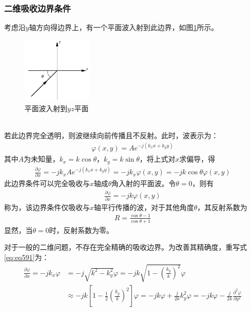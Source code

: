 \documentclass{article}
\numberwithin{equation}{section}
\begin{document}
\subsubsection{二维吸收边界条件}
考虑沿$y$轴方向得边界上，有一个平面波入射到此边界，如图\ref{fig:fig51}所示。
\begin{figure}[ht]
    \centering
    \includegraphics[width=0.3\textwidth]{平面波入射到yz平面.PNG}
    \caption{平面波入射到$yz$平面}
    \label{fig:fig51}
\end{figure}
\\
若此边界完全透明，则波继续向前传播且不反射。此时，波表示为：
\begin{align}
    \label{eq:eq590}
    \varphi(x,y)=Ae^{-j(k_xx+k_yy)}
\end{align}
其中$A$为未知量，$k_x=k\cos\theta$，$k_y=k\sin\theta$，将上式对$x$求偏导，得
\begin{align}
    \label{eq:eq591}
    \frac{\partial \varphi}{\partial x}=-jk_xAe^{-j(k_xx+k_yy)}=-jk_x\varphi(x,y)=-jk\cos\theta\varphi(x,y)
\end{align}
此边界条件可以完全吸收与$x$轴成$\theta$角入射的平面波。令$\theta=0$，则有
\begin{align}
    \label{eq:eq592}
    \frac{\partial \varphi}{\partial x}=-jk\varphi(x,y)
\end{align}
称为\textbf{\color{blue}{一阶吸收边界条件}}，该边界条件仅吸收与$x$轴平行传播的波，对于其他角度$\theta$，其反射系数为
\begin{align}
    \label{eq:eq593}
    R=\frac{\cos\theta-1}{\cos\theta+1}
\end{align}
显然，当$\theta=0$时，反射系数为零。\par
对于一般的二维问题，不存在完全精确的吸收边界。为改善其精确度，重写式\ref{eq:eq591}为：
\begin{align}
    \label{eq:eq594}
    \frac{\partial \varphi}{\partial x}=-jk_x\varphi&=-j\sqrt{k^2-k_y^2}\varphi=-jk\sqrt{1-\left(\frac{k_y}{k}\right)^2}\varphi \nonumber \\
    &\approx-jk\left[1-\frac{1}{2}\left(\frac{k_y}{k}\right)^2\right]\varphi=-jk\varphi+\frac{j}{2k}k_y^2\varphi=-jk\varphi-\frac{j}{2k}\frac{\partial^2\varphi}{\partial y^2}
\end{align}
\end{document}

